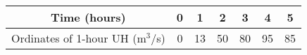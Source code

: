 
\begin{tabular}{|c|c|c|c|c|c|c|}
\hline
Time (hours) & 0 & 1 & 2 & 3 & 4 & 5 \\
\hline
Ordinates of 1-hour UH (m$^3$/s) & 0 & 13 & 50 & 80 & 95 & 85 \\
\hline
\end{tabular}
